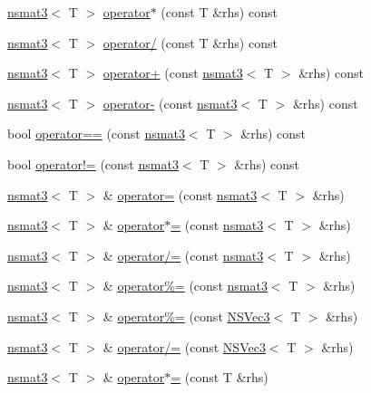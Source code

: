 \begin{DoxyCompactItemize}
\item 
\hyperlink{structnsmat3}{nsmat3}$<$ T $>$ \hyperlink{structnsmat3_ac8bd0e8b2bad48db247c269813dc20cb}{operator$\ast$} (const T \&rhs) const 
\item 
\hyperlink{structnsmat3}{nsmat3}$<$ T $>$ \hyperlink{structnsmat3_abcd982a476ce7d660b7a57d6c959587b}{operator/} (const T \&rhs) const 
\item 
\hyperlink{structnsmat3}{nsmat3}$<$ T $>$ \hyperlink{structnsmat3_a1fab22e384009ea3ea467fce310b9c17}{operator+} (const \hyperlink{structnsmat3}{nsmat3}$<$ T $>$ \&rhs) const 
\item 
\hyperlink{structnsmat3}{nsmat3}$<$ T $>$ \hyperlink{structnsmat3_aec2554225424859cb377994613140bb8}{operator-\/} (const \hyperlink{structnsmat3}{nsmat3}$<$ T $>$ \&rhs) const 
\item 
bool \hyperlink{structnsmat3_a0b02d8212af62e7f10fe706b896a587f}{operator==} (const \hyperlink{structnsmat3}{nsmat3}$<$ T $>$ \&rhs) const 
\item 
bool \hyperlink{structnsmat3_a53d3dcd405fe44e73c45e15bb340aeaa}{operator!=} (const \hyperlink{structnsmat3}{nsmat3}$<$ T $>$ \&rhs) const 
\item 
\hyperlink{structnsmat3}{nsmat3}$<$ T $>$ \& \hyperlink{structnsmat3_a89047ca28c9f8259e913d34f285396d4}{operator=} (const \hyperlink{structnsmat3}{nsmat3}$<$ T $>$ \&rhs)
\item 
\hyperlink{structnsmat3}{nsmat3}$<$ T $>$ \& \hyperlink{structnsmat3_ad5ced90566e80c7e73862962b3859808}{operator$\ast$=} (const \hyperlink{structnsmat3}{nsmat3}$<$ T $>$ \&rhs)
\item 
\hyperlink{structnsmat3}{nsmat3}$<$ T $>$ \& \hyperlink{structnsmat3_a9a7c1264d944d53c74c2633533e44bc6}{operator/=} (const \hyperlink{structnsmat3}{nsmat3}$<$ T $>$ \&rhs)
\item 
\hyperlink{structnsmat3}{nsmat3}$<$ T $>$ \& \hyperlink{structnsmat3_ac5abf4ef654e0718119bee8842e3a643}{operator\%=} (const \hyperlink{structnsmat3}{nsmat3}$<$ T $>$ \&rhs)
\item 
\hyperlink{structnsmat3}{nsmat3}$<$ T $>$ \& \hyperlink{structnsmat3_a0f28eb08744b02fc401e0077167b1694}{operator\%=} (const \hyperlink{structNSVec3}{N\-S\-Vec3}$<$ T $>$ \&rhs)
\item 
\hyperlink{structnsmat3}{nsmat3}$<$ T $>$ \& \hyperlink{structnsmat3_a5ad8f55ada25206370e604ce63a6ab91}{operator/=} (const \hyperlink{structNSVec3}{N\-S\-Vec3}$<$ T $>$ \&rhs)
\item 
\hyperlink{structnsmat3}{nsmat3}$<$ T $>$ \& \hyperlink{structnsmat3_a54ef111b74d40f62e97c4fa8f8533d89}{operator$\ast$=} (const T \&rhs)

\end{DoxyCompactItemize}
